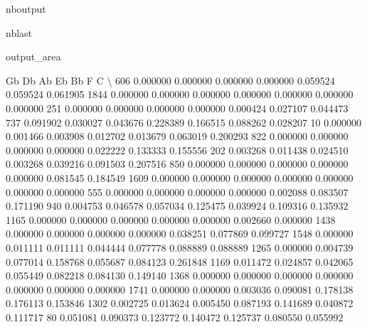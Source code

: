 \documentclass[letterpaper,10pt,english]{sphinxmanual}
\begin{document}
\begin{sphinxuseclass}{nboutput}
\begin{sphinxuseclass}{nblast}
{\begin{sphinxuseclass}{output_area}
\begin{sphinxuseclass}{}
\begin{sphinxVerbatim}[commandchars=\\\{\}]
            Gb        Db        Ab        Eb        Bb         F         C  \textbackslash{}
606   0.000000  0.000000  0.000000  0.000000  0.059524  0.059524  0.061905
1844  0.000000  0.000000  0.000000  0.000000  0.000000  0.000000  0.000000
251   0.000000  0.000000  0.000000  0.000000  0.000424  0.027107  0.044473
737   0.091902  0.030027  0.043676  0.228389  0.166515  0.088262  0.028207
10    0.000000  0.001466  0.003908  0.012702  0.013679  0.063019  0.200293
822   0.000000  0.000000  0.000000  0.000000  0.022222  0.133333  0.155556
202   0.003268  0.011438  0.024510  0.003268  0.039216  0.091503  0.207516
850   0.000000  0.000000  0.000000  0.000000  0.000000  0.081545  0.184549
1609  0.000000  0.000000  0.000000  0.000000  0.000000  0.000000  0.000000
555   0.000000  0.000000  0.000000  0.000000  0.002088  0.083507  0.171190
940   0.004753  0.046578  0.057034  0.125475  0.039924  0.109316  0.135932
1165  0.000000  0.000000  0.000000  0.000000  0.000000  0.002660  0.000000
1438  0.000000  0.000000  0.000000  0.000000  0.038251  0.077869  0.099727
1548  0.000000  0.011111  0.011111  0.044444  0.077778  0.088889  0.088889
1265  0.000000  0.004739  0.077014  0.158768  0.055687  0.084123  0.261848
1169  0.011472  0.024857  0.042065  0.055449  0.082218  0.084130  0.149140
1368  0.000000  0.000000  0.000000  0.000000  0.000000  0.000000  0.000000
1741  0.000000  0.000000  0.003036  0.090081  0.178138  0.176113  0.153846
1302  0.002725  0.013624  0.005450  0.087193  0.141689  0.040872  0.111717
80    0.051081  0.090373  0.123772  0.140472  0.125737  0.080550  0.055992


\end{sphinxVerbatim}
\end{sphinxuseclass}
\end{sphinxuseclass}}
\end{sphinxuseclass}
\end{sphinxuseclass}
\end{document}
